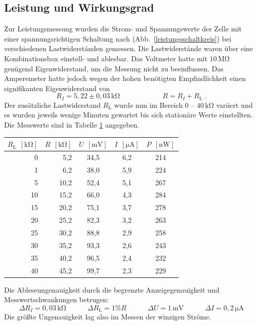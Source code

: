 \documentclass[11pt]{scrartcl}
\newcommand{\unit}[1]{\ensuremath{\,\mathrm{#1}}} %
\begin{document}
\subsection{Leistung und Wirkungsgrad}
Zur Leistungsmessung wurden die Strom- und Spannungswerte der Zelle mit einer spannungsrichtigen Schaltung nach (Abb.~\ref{leistungsschaltkreis}) bei verschiedenen Lastwiderständen gemessen. Die Lastwiderstände waren über eine Kombinationsbox einstell- und ablesbar. Das Voltmeter hatte mit $10\unit{M\Omega}$ genügend Eigenwiderstand, um die Messung nicht zu beeinflussen. Das Amperemeter hatte jedoch wegen der hohen benötigten Empfindlichkeit einen signifikanten Eigenwiderstand von
\[
R_I = 5,22\pm 0,03 \unit{k\Omega}
\qquad\qquad\qquad
R = R_I+R_{\text{L}}\;.
\]
Der zusätzliche Lastwiderstand $R_{\text{L}}$ wurde nun im Bereich 0 -- $40\unit{k\Omega}$ variiert und es wurden jeweils wenige Minuten gewartet bis sich stationäre Werte einstellten. Die Messwerte sind in Tabelle \ref{leistungsmesstabelle} angegeben.
\begin{table}[ht]
\label{leistungsmesstabelle}
\begin{center}
\begin{tabular}{rr|ccc}
$R_{\text{L}}\; \unit{[k\Omega]}$ &
$R\; \unit{[k\Omega]}$ &
$U\; \unit{[mV]}$ &
$I\; \unit{[\mu A]}$ &
$P\; \unit{[nW]}$ \\
\hline
0	& 5,2	& 34,5	& 6,2	& 214 \\
1	& 6,2	& 38,0	& 5,9	& 224 \\
5	& 10,2	& 52,4	& 5,1	& 267 \\
10	& 15,2	& 66,0	& 4,3	& 284 \\
15	& 20,2	& 75,1	& 3,7	& 278 \\
20	& 25,2	& 82,3	& 3,2	& 263 \\
25	& 30,2	& 88,8	& 2,9	& 258 \\
30	& 35,2	& 93,3	& 2,6	& 243 \\
35	& 40,2	& 96,5	& 2,4	& 232 \\
40	& 45,2	& 99,7	& 2,3	& 229
\end{tabular}
\end{center}
\end{table}
Die Ableseungenauigkeit durch die begrenzte Anzeigegenauigkeit und Messwertschwankungen betrugen:
\[
\Delta R_I = 0,03\unit{k\Omega}
\qquad\quad
\Delta R_{\text{L}} = 1\% R
\qquad\quad
\Delta U = 1\unit{mV}
\qquad\quad
\Delta I = 0,2\unit{\mu A}
\]
Die größte Ungenauigkeit lag also im Messen der winzigen Ströme.
\end{document}
